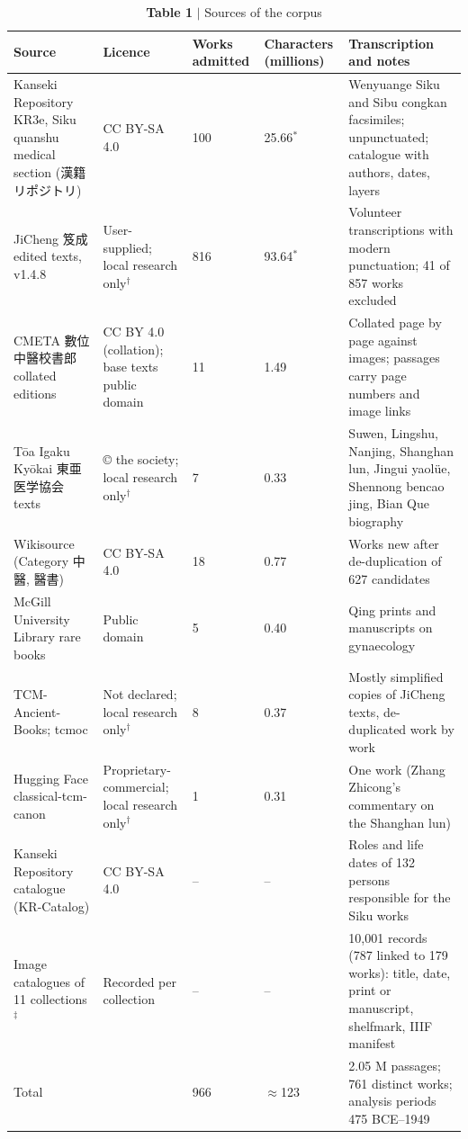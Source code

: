 \begin{table}[t]
\small
\caption{\textbf{Table 1} $|$ Sources of the corpus}
\begin{tabular}{lllll}
\toprule
Source & Licence & Works admitted & Characters (millions) & Transcription and notes \\
\midrule
Kanseki Repository KR3e, Siku quanshu medical section (漢籍リポジトリ) & CC BY-SA 4.0 & 100 & 25.66$^{*}$ & Wenyuange Siku and Sibu congkan facsimiles; unpunctuated; catalogue with authors, dates, layers \\
JiCheng 笈成 edited texts, v1.4.8 & User-supplied; local research only$^{\dagger}$ & 816 & 93.64$^{*}$ & Volunteer transcriptions with modern punctuation; 41 of 857 works excluded \\
CMETA 數位中醫校書郎 collated editions & CC BY 4.0 (collation); base texts public domain & 11 & 1.49 & Collated page by page against images; passages carry page numbers and image links \\
Tōa Igaku Kyōkai 東亜医学協会 texts & © the society; local research only$^{\dagger}$ & 7 & 0.33 & Suwen, Lingshu, Nanjing, Shanghan lun, Jingui yaolüe, Shennong bencao jing, Bian Que biography \\
Wikisource (Category 中醫, 醫書) & CC BY-SA 4.0 & 18 & 0.77 & Works new after de-duplication of 627 candidates \\
McGill University Library rare books & Public domain & 5 & 0.40 & Qing prints and manuscripts on gynaecology \\
TCM-Ancient-Books; tcmoc & Not declared; local research only$^{\dagger}$ & 8 & 0.37 & Mostly simplified copies of JiCheng texts, de-duplicated work by work \\
Hugging Face classical-tcm-canon & Proprietary-commercial; local research only$^{\dagger}$ & 1 & 0.31 & One work (Zhang Zhicong's commentary on the Shanghan lun) \\
Kanseki Repository catalogue (KR-Catalog) & CC BY-SA 4.0 & – & – & Roles and life dates of 132 persons responsible for the Siku works \\
Image catalogues of 11 collections$^{\ddagger}$ & Recorded per collection & – & – & 10,001 records (787 linked to 179 works): title, date, print or manuscript, shelfmark, IIIF manifest \\
\addlinespace
Total &  & 966 & $\approx$123 & 2.05 M passages; 761 distinct works; analysis periods 475 BCE–1949 \\

\end{tabular}
\end{table}
